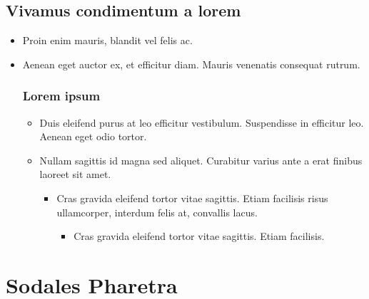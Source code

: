 \documentclass[header]{nosvagor-notes}
\begin{document}
\section{Vivamus condimentum a lorem}
\begin{itemize}
  \item Proin enim mauris, blandit vel felis ac.

  \item Aenean eget auctor ex, et efficitur diam. Mauris venenatis consequat rutrum.

  \subsection{Lorem ipsum}
  \begin{itemize}
    \item Duis eleifend purus at leo efficitur vestibulum. Suspendisse in
      efficitur leo. Aenean eget odio tortor.

    \item Nullam sagittis id magna sed aliquet. Curabitur varius ante a erat
      finibus laoreet sit amet.
      \begin{itemize}
        \item Cras gravida eleifend tortor vitae sagittis. Etiam facilisis
          risus ullamcorper, interdum felis at, convallis lacus.
          \begin{itemize}
            \item Cras gravida eleifend tortor vitae sagittis. Etiam facilisis.

          \end{itemize}
      \end{itemize}
  \end{itemize}
\end{itemize}

\chapter{Sodales Pharetra}
\end{document}
